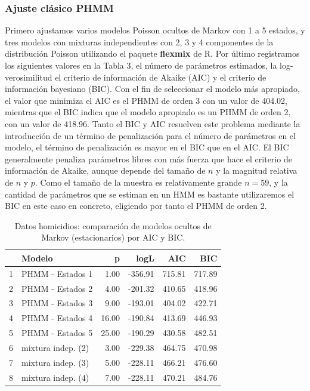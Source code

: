 \documentclass[a4paper]{article}\usepackage[]{graphicx}\usepackage[]{color}
\begin{document}
\subsubsection*{Ajuste clásico PHMM}





Primero ajustamos varios modelos Poisson ocultos de Markov con 1 a 5 estados, y tres modelos con mixturas independientes con 2, 3 y 4 componentes de la distribución Poisson utilizando el paquete \textbf{flexmix} de R. Por último registramos los siguientes valores en la Tabla 3, el número de parámetros estimados, la log-verosimilitud el criterio de información de Akaike (AIC) y el criterio de información bayesiano (BIC). Con el fin de seleccionar el modelo más apropiado, el valor que minimiza el AIC es el PHMM de orden 3 con un valor de 404.02, mientras que el BIC indica que el modelo apropiado es un PHMM de orden 2, con un valor de 418.96. Tanto el BIC y AIC resuelven este problema mediante la introducción de un término de penalización para el número de parámetros en el modelo, el término de penalización es mayor en el BIC que en el AIC. El BIC generalmente penaliza parámetros libres con más fuerza que hace el criterio de información de Akaike, aunque depende del tamaño de $n$ y la magnitud relativa de $n$ y $p$. Como el tamaño de la muestra es relativamente grande $n = 59$, y la cantidad de parámetros que se estiman en un HMM es bastante utilizaremos el BIC en este caso en concreto, eligiendo por tanto el PHMM de orden 2.

\begin{table}[ht]
\centering
\begin{tabular}{rlrrrr}
  \hline
 & Modelo & p & logL & AIC & BIC \\ 
  \hline
1 & PHMM - Estados 1 & 1.00 & -356.91 & 715.81 & 717.89 \\ 
  2 & PHMM - Estados 2 & 4.00 & -201.32 & 410.65 & 418.96 \\ 
  3 & PHMM - Estados 3 & 9.00 & -193.01 & 404.02 & 422.71 \\ 
  4 & PHMM - Estados 4 & 16.00 & -190.84 & 413.69 & 446.93 \\ 
  5 & PHMM - Estados 5 & 25.00 & -190.29 & 430.58 & 482.51 \\ 
  6 & mixtura indep. (2) & 3.00 & -229.38 & 464.75 & 470.98 \\ 
  7 & mixtura indep. (3) & 5.00 & -228.11 & 466.21 & 476.60 \\ 
  8 & mixtura indep. (4) & 7.00 & -228.11 & 470.21 & 484.76 \\ 
   \hline
\end{tabular}
\caption{Datos homicidios: comparación de modelos ocultos de Markov (estacionarios) por AIC y BIC.} 
\end{table}
\end{document}
